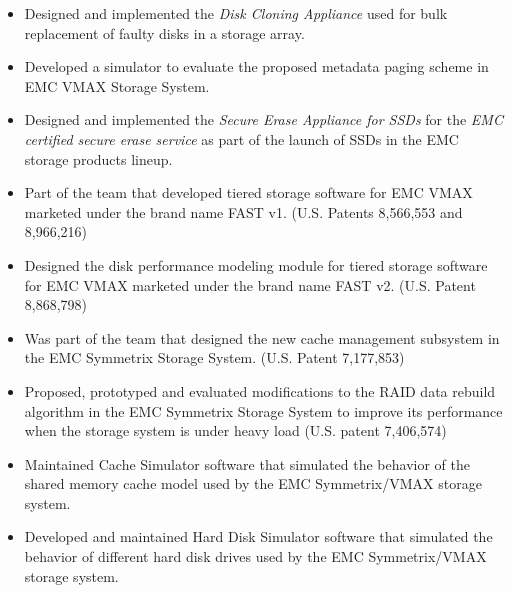 {
	\begin{itemize}
        \item Designed and implemented the {\em Disk Cloning Appliance} used for bulk
            replacement of faulty disks in a storage array.
		\item Developed a simulator to evaluate the proposed metadata paging
			scheme in EMC VMAX Storage System.
	\end{itemize}
}
{ 
	\begin{itemize}
		\item Designed and implemented the {\em Secure Erase Appliance for SSDs}
			for the {\em EMC certified secure erase service} as part of the
			launch of SSDs in the EMC storage products lineup.
		\item Part of the team that developed tiered storage software for
			EMC VMAX marketed under the brand name FAST v1. (U.S. Patents
			8,566,553 and 8,966,216)
		\item Designed the disk performance modeling module for tiered storage
			software for EMC VMAX marketed under the brand name FAST v2.
			(U.S. Patent 8,868,798)
	\end{itemize}
}
{
	\begin{itemize}
		\item Was part of the team that designed the new cache management subsystem in the EMC Symmetrix Storage System.
			(U.S. Patent 7,177,853)
		\item Proposed, prototyped and evaluated modifications to the RAID data rebuild algorithm
			in the EMC Symmetrix Storage System to improve its performance when
			the storage system is under heavy load (U.S. patent 7,406,574)
		\item Maintained Cache Simulator software that simulated the behavior of the 
			shared memory cache model used by the EMC Symmetrix/VMAX storage system.
		\item Developed and maintained Hard Disk Simulator software that
			simulated the behavior of different hard disk drives used by the
			EMC Symmetrix/VMAX storage system.
	\end{itemize}
}
